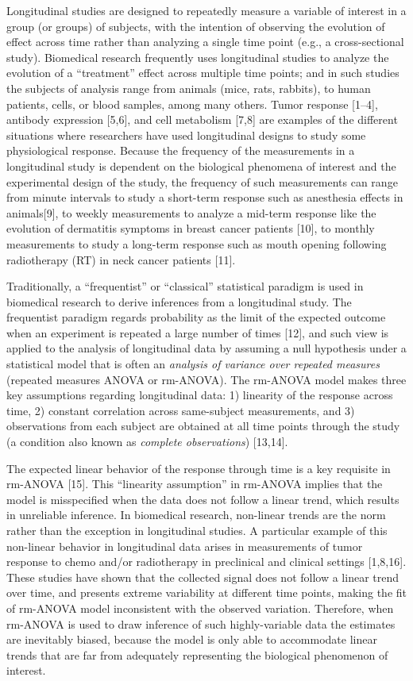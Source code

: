 \documentclass[
]{article}
\begin{document}
Longitudinal studies are designed to repeatedly measure a variable of interest in a group (or groups) of subjects, with the intention of observing the evolution of effect across time rather than analyzing a single time point (e.g., a cross-sectional study). Biomedical research frequently uses longitudinal studies to analyze the evolution of a ``treatment'' effect across multiple time points; and in such studies the subjects of analysis range from animals (mice, rats, rabbits), to human patients, cells, or blood samples, among many others. Tumor response {[}1--4{]}, antibody expression {[}5,6{]}, and cell metabolism {[}7,8{]} are examples of the different situations where researchers have used longitudinal designs to study some physiological response. Because the frequency of the measurements in a longitudinal study is dependent on the biological phenomena of interest and the experimental design of the study, the frequency of such measurements can range from minute intervals to study a short-term response such as anesthesia effects in animals{[}9{]}, to weekly measurements to analyze a mid-term response like the evolution of dermatitis symptoms in breast cancer patients {[}10{]}, to monthly measurements to study a long-term response such as mouth opening following radiotherapy (RT) in neck cancer patients {[}11{]}.

Traditionally, a ``frequentist'' or ``classical'' statistical paradigm is used in biomedical research to derive inferences from a longitudinal study. The frequentist paradigm regards probability as the limit of the expected outcome when an experiment is repeated a large number of times {[}12{]}, and such view is applied to the analysis of longitudinal data by assuming a null hypothesis under a statistical model that is often an \emph{analysis of variance over repeated measures} (repeated measures ANOVA or rm-ANOVA). The rm-ANOVA model makes three key assumptions regarding longitudinal data: 1) linearity of the response across time, 2) constant correlation across same-subject measurements, and 3) observations from each subject are obtained at all time points through the study (a condition also known as \emph{complete observations}) {[}13,14{]}.

The expected linear behavior of the response through time is a key requisite in rm-ANOVA {[}15{]}. This ``linearity assumption'' in rm-ANOVA implies that the model is misspecified when the data does not follow a linear trend, which results in unreliable inference. In biomedical research, non-linear trends are the norm rather than the exception in longitudinal studies. A particular example of this non-linear behavior in longitudinal data arises in measurements of tumor response to chemo and/or radiotherapy in preclinical and clinical settings {[}1,8,16{]}. These studies have shown that the collected signal does not follow a linear trend over time, and presents extreme variability at different time points, making the fit of rm-ANOVA model inconsistent with the observed variation. Therefore, when rm-ANOVA is used to draw inference of such highly-variable data the estimates are inevitably biased, because the model is only able to accommodate linear trends that are far from adequately representing the biological phenomenon of interest.
\end{document}
